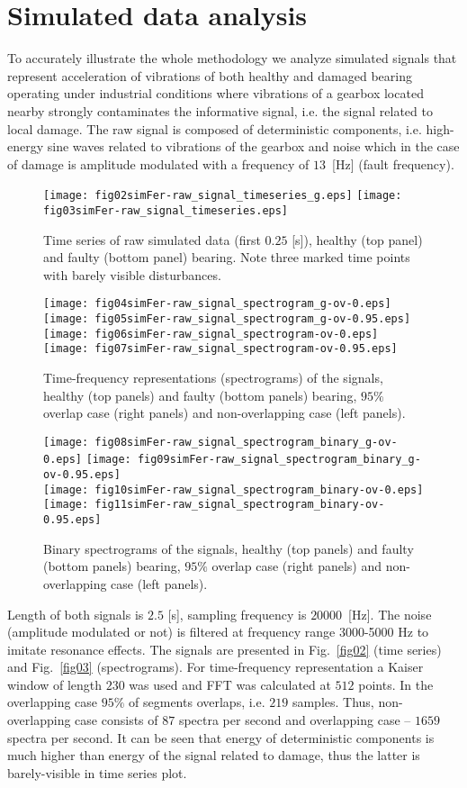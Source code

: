 \documentclass[3p,times]{elsarticle}
\begin{document}
\section{Simulated data analysis}\label{simulated}
To accurately illustrate the whole methodology  we analyze simulated signals that  represent acceleration of vibrations of both healthy and damaged bearing operating under industrial conditions where vibrations of a gearbox located nearby strongly contaminates the informative signal, i.e. the signal related to local damage. The raw signal is composed of deterministic components, i.e. high-energy sine waves related to vibrations of the gearbox and noise which in the case of damage is amplitude modulated with a frequency of $13$~[Hz] (fault frequency).
\begin{figure}[!ht]
\begin{center}
\texttt{[image: fig02simFer-raw\_signal\_timeseries\_g.eps]}
\texttt{[image: fig03simFer-raw\_signal\_timeseries.eps]}
\caption{Time series of raw simulated data (first $0.25$ [s]), healthy (top panel) and faulty (bottom panel) bearing. Note three marked time points with barely visible disturbances.}\label{fig02}
\texttt{[image: fig04simFer-raw\_signal\_spectrogram\_g-ov-0.eps]}
\texttt{[image: fig05simFer-raw\_signal\_spectrogram\_g-ov-0.95.eps]}\\
\texttt{[image: fig06simFer-raw\_signal\_spectrogram-ov-0.eps]}
\texttt{[image: fig07simFer-raw\_signal\_spectrogram-ov-0.95.eps]}
\caption{Time-frequency representations (spectrograms) of the signals, healthy (top panels) and faulty (bottom panels) bearing, $95\%$ overlap case (right panels) and non-overlapping case (left panels).}
\label{fig03}
\texttt{[image: fig08simFer-raw\_signal\_spectrogram\_binary\_g-ov-0.eps]}
\texttt{[image: fig09simFer-raw\_signal\_spectrogram\_binary\_g-ov-0.95.eps]}\\
\texttt{[image: fig10simFer-raw\_signal\_spectrogram\_binary-ov-0.eps]}
\texttt{[image: fig11simFer-raw\_signal\_spectrogram\_binary-ov-0.95.eps]}
\caption{Binary spectrograms of the signals, healthy (top panels) and faulty (bottom panels) bearing, $95\%$ overlap case (right panels) and non-overlapping case (left panels).}\label{fig04}
\end{center}
\end{figure}
Length of both signals is $2.5$ [s], sampling frequency is $20000 $~[Hz]. The noise (amplitude modulated or not) is filtered at frequency range 3000-5000 Hz to imitate resonance effects. The signals are presented in Fig.~\ref{fig02} (time series) and Fig.~\ref{fig03} (spectrograms). For time-frequency representation a Kaiser window of length $230$ was used and FFT was calculated at $512$ points. In the overlapping case $95\%$ of segments overlaps, i.e. $219$ samples. Thus, non-overlapping case consists of $87$ spectra per second and overlapping case -- $1659$ spectra per second. It can be seen that energy of deterministic components is much higher than energy of the signal related to damage, thus the latter is barely-visible in time series plot.\\
\end{document}
